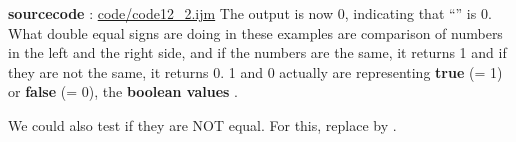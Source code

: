 \textbf{sourcecode} : \href{http://www.example.com/contents}{code/code12\_2.ijm}
The output is now 0, indicating that ``'' is
0.
What double equal signs \ilcom{==} are doing in these
examples are comparison of numbers in the left and the right side, and if
the numbers are the same, it returns 1 and if they are not the same, it returns 0. 1 and
0 actually are representing \textbf{true} (= 1) or \textbf{false} (= 0), the
\textbf{boolean values} .

We could also test if they are NOT equal. For this, replace \ilcom{==} by
\ilcom{!=}.